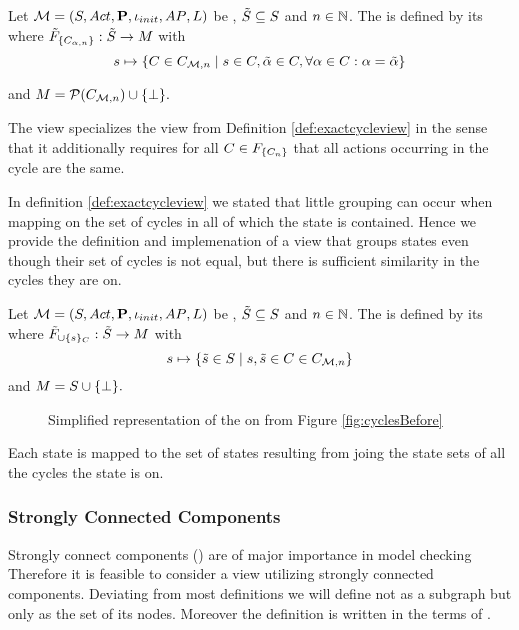 \documentclass[preview]{standalone}
\begin{document}
\begin{definition}
	Let ${{{\mathcal{M}}}} = {{({S}, {Act}, {\textbf{P}}, {\iota_{init}}, {AP}, {L})}}$ be \achgphN, ${\tilde{{S}}} \subseteq {S}$ and $n \in {\mathbb{N}}$. The \viewN \viewexactactcycle is defined by its \grpfctN where ${{\tilde{F}_{{\{{C}_{{\alpha},n}\}}}}} : {\tilde{{S}}} \to {\ensuremath{{M}}}$ with
	\[
	\state \mapsto \{\cycle \in \cycleset \mid \state \in \cycle, \tilde{\action} \in \cycle, \forall \action \in \cycle : \action = \tilde{\action} \}
	\]
	
	and ${{M}} = {\mathcal{P}({{C}_{{{\mathcal{M}}}, n}})} \cup {\{\bot\}}.$
\end{definition}

The view specializes the view from Definition \ref{def:exactcycleview} in the sense that it additionally requires for all ${C} \in {\ensuremath{{F_{{\{{C}_n\}}}}}}$ that all actions occurring in the cycle are the same. 


In definition \ref{def:exactcycleview} we stated that little grouping can occur when mapping on the set of cycles in all of which the state is contained. Hence we provide the definition and implemenation of a view that groups states even though their set of cycles is not equal, but there is sufficient similarity in the cycles they are on.

\begin{definition}
	Let ${{{\mathcal{M}}}} = {{({S}, {Act}, {\textbf{P}}, {\iota_{init}}, {AP}, {L})}}$ be \achgphN, ${\tilde{{S}}} \subseteq {S}$ and $n \in {\mathbb{N}}$. The \viewN \viewcycleset is defined by its \grpfctN where $\gfctsubcycleset : \smstates \to \imggrp$ with
	\[
	\state \mapsto \{\smstate \in \states \mid \state, \smstate \in \cycle \in \cycleset\}
	\]
	and ${{M}} = {S} \cup {\{\bot\}}.$
\end{definition}

\begin{figure}[h]
	\centering
	
	\caption{Simplified representation of the \viewN \viewcycleset on \mdp from Figure \ref{fig:cyclesBefore}} 
	\label{fig:cycleAfterSet0}  
\end{figure}


Each state is mapped to the set of states resulting from joing the state sets of all the cycles the state is on. 

\subsubsection{Strongly Connected Components}
Strongly connect components (\sccN) are of major importance in model checking 
Therefore it is feasible to consider a view utilizing strongly connected components. Deviating from most definitions we will define \sccN not as a subgraph but only as the set of its nodes. Moreover the definition is written in the terms of \achgphN.
\end{document}
